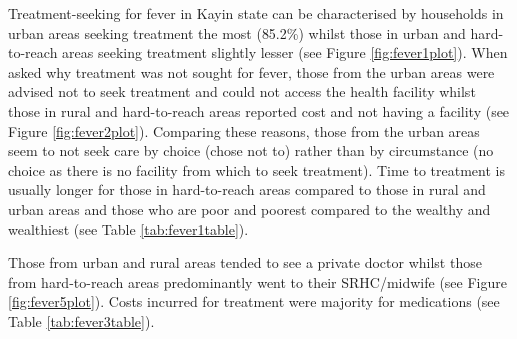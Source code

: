 \documentclass[12pt,a4paper]{article}
\begin{document}
Treatment-seeking for fever in Kayin state can be characterised by households in urban areas seeking treatment the most (85.2\%) whilst those in urban and hard-to-reach areas seeking treatment slightly lesser (see Figure \ref{fig:fever1plot}). When asked why treatment was not sought for fever, those from the urban areas were advised not to seek treatment and could not access the health facility whilst those in rural and hard-to-reach areas reported cost and not having a facility (see Figure \ref{fig:fever2plot}). Comparing these reasons, those from the urban areas seem to not seek care by choice (chose not to) rather than by circumstance (no choice as there is no facility from which to seek treatment). Time to treatment is usually longer for those in hard-to-reach areas compared to those in rural and urban areas and those who are poor and poorest compared to the wealthy and wealthiest (see Table \ref{tab:fever1table}).

Those from urban and rural areas tended to see a private doctor whilst those from hard-to-reach areas predominantly went to their SRHC/midwife (see Figure \ref{fig:fever5plot}). Costs incurred for treatment were majority for medications (see Table \ref{tab:fever3table}).
\end{document}
